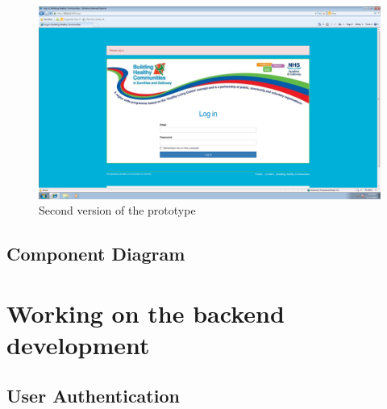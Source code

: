 \documentclass{l3proj}
\begin{document}
\begin{figure}
  \centerline{\includegraphics[width=\textwidth, height=\textheight, keepaspectratio]{newhome.png}}
  \caption{Second version of the prototype}
\end{figure}

 

\subsection{Component Diagram}
\label{sec:component}


\section{Working on the backend development}
\label{sec:backend}


\subsection{User Authentication}
\label{sec:authentication} 
\end{document}
